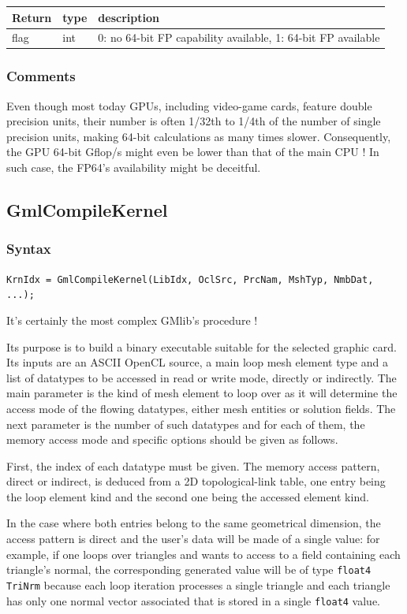 \documentclass[a4paper,12pt]{article}
\begin{document}
\medskip

\begin{tabular}{|m{2cm}|m{1.5cm}|m{10.5cm}|}
\hline
Return     & type   & description \\
\hline
flag       & int    & 0: no 64-bit FP capability available, 1: 64-bit FP available \\
\hline
\end{tabular}

\subsubsection*{Comments}
Even though most today GPUs, including video-game cards, feature double precision units, their number is often 1/32th to 1/4th of the number of single precision units, making 64-bit calculations as many times slower. Consequently, the GPU 64-bit Gflop/s might even be lower than that of the main CPU ! In such case, the FP64's availability might be deceitful.


\subsection{GmlCompileKernel}

\subsubsection*{Syntax}
{\tt KrnIdx = GmlCompileKernel(LibIdx, OclSrc, PrcNam, MshTyp, NmbDat, ...);}

It's certainly the most complex GMlib's procedure !

Its purpose is to build a binary executable suitable for the selected graphic card. Its inputs are an ASCII OpenCL source, a main loop mesh element type and a list of datatypes to be accessed in read or write mode, directly or indirectly. The main parameter is the kind of mesh element to loop over as it will determine the access mode of the flowing datatypes, either mesh entities or solution fields. The next parameter is the number of such datatypes and for each of them, the memory access mode and specific options should be given as follows.

First, the index of each datatype must be given. The memory access pattern, direct or indirect, is deduced from a 2D topological-link table, one entry being the loop element kind and the second one being the accessed element kind.

In the case where both entries belong to the same geometrical dimension, the access pattern is direct and the user's data will be made of a single value: for example, if one loops over triangles and wants to access to a field containing each triangle's normal, the corresponding generated value will be of type {\tt float4 TriNrm} because each loop iteration processes a single triangle and each triangle has only one normal vector associated that is stored in a single {\tt float4} value.
\end{document}
